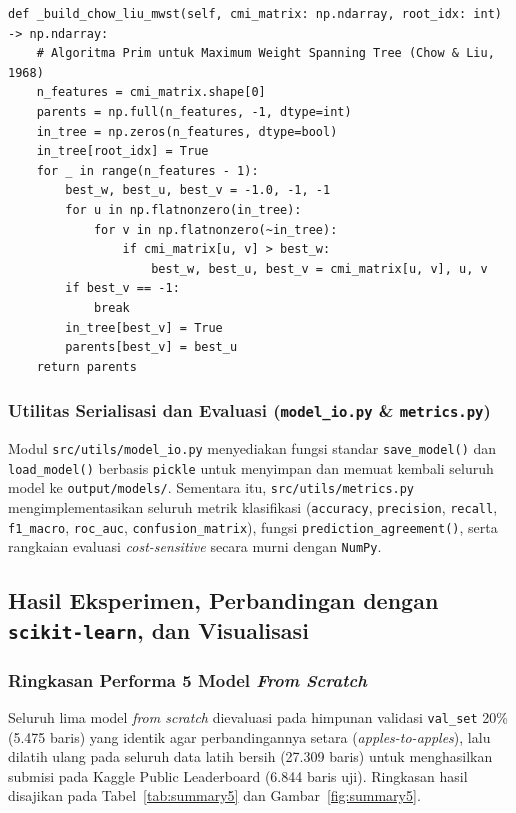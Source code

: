 \documentclass[11pt,a4paper]{article}
\numberwithin{figure}{section}
\numberwithin{table}{section}
\begin{document}
\noindent\begin{minipage}{\linewidth}
\begin{lstlisting}
def _build_chow_liu_mwst(self, cmi_matrix: np.ndarray, root_idx: int) -> np.ndarray:
    # Algoritma Prim untuk Maximum Weight Spanning Tree (Chow & Liu, 1968)
    n_features = cmi_matrix.shape[0]
    parents = np.full(n_features, -1, dtype=int)
    in_tree = np.zeros(n_features, dtype=bool)
    in_tree[root_idx] = True
    for _ in range(n_features - 1):
        best_w, best_u, best_v = -1.0, -1, -1
        for u in np.flatnonzero(in_tree):
            for v in np.flatnonzero(~in_tree):
                if cmi_matrix[u, v] > best_w:
                    best_w, best_u, best_v = cmi_matrix[u, v], u, v
        if best_v == -1:
            break
        in_tree[best_v] = True
        parents[best_v] = best_u
    return parents
\end{lstlisting}
\end{minipage}

\subsubsection[Utilitas Serialisasi dan Evaluasi]{Utilitas Serialisasi dan Evaluasi (\texttt{model\_io.py} \& \texttt{metrics.py})}

Modul \texttt{src/utils/model\_io.py} menyediakan fungsi standar \texttt{save\_model()} dan \texttt{load\_model()} berbasis \texttt{pickle} untuk menyimpan dan memuat kembali seluruh model ke \texttt{output/models/}. Sementara itu, \texttt{src/utils/metrics.py} mengimplementasikan seluruh metrik klasifikasi (\texttt{accuracy}, \texttt{precision}, \texttt{recall}, \texttt{f1\_macro}, \texttt{roc\_auc}, \texttt{confusion\_matrix}), fungsi \texttt{prediction\_agreement()}, serta rangkaian evaluasi \textit{cost-sensitive} secara murni dengan \texttt{NumPy}.

\subsection{Hasil Eksperimen, Perbandingan dengan \texttt{scikit-learn}, dan Visualisasi}

\subsubsection{Ringkasan Performa 5 Model \textit{From Scratch}}

Seluruh lima model \textit{from scratch} dievaluasi pada himpunan validasi \texttt{val\_set} 20\% (5.475 baris) yang identik agar perbandingannya setara (\textit{apples-to-apples}), lalu dilatih ulang pada seluruh data latih bersih (27.309 baris) untuk menghasilkan submisi pada Kaggle Public Leaderboard (6.844 baris uji). Ringkasan hasil disajikan pada Tabel~\ref{tab:summary5} dan Gambar~\ref{fig:summary5}.
\end{document}
